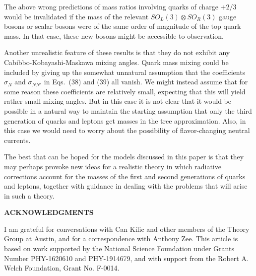 The above wrong predictions of mass ratios involving quarks of charge $+2/3$ would be invalidated if the mass of the relevant 
$SO_L(3)\otimes  SO_R(3)$ gauge bosons or scalar bosons were of the same order of magnitude of the top quark mass.  In that case, these new bosons might be accessible to observation.

Another unrealistic feature of these results is that they do not exhibit any Cabibbo-Kobayashi-Maskawa mixing angles.  Quark mass mixing could be included  by giving up the somewhat unnatural  assumption that the coefficients $\sigma_N$ and $\sigma_{NN'}$ in Eqs.~(38) and (39) all vanish.  
We might instead assume that for some reason these coefficients are relatively small, expecting that this will  yield rather small mixing angles.  But in this case it is not clear that it would be possible in a natural way to maintain the starting assumption that only the third generation of quarks and leptons get masses in the tree approximation.  Also, in this case we would need to worry about the possibility of flavor-changing neutral currents.

The best that can be hoped for the models discussed in this paper is that  they may perhaps provoke new ideas for  a realistic theory in which  radiative corrections  account for the masses of the first and second generations of quarks and leptons, together with  guidance in dealing with the problems that will arise in such a theory.

\begin{center}
 {\bf ACKNOWLEDGMENTS}
\end{center} 

I am grateful for conversations with Can Kilic and other members of the Theory Group at Austin, and for a correspondence with Anthony Zee.  This article is based on work supported by the National Science Foundation
 under Grants Number PHY-1620610 and PHY-1914679, and with support from the Robert A. Welch Foundation, Grant No. F-0014.

